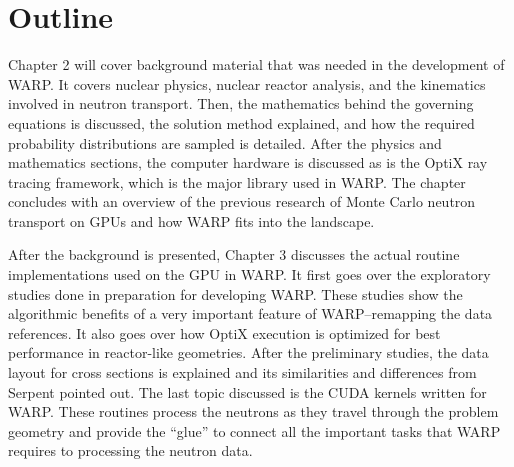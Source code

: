 
\section{Outline}

Chapter 2 will cover background material that was needed in the development of WARP.  It covers nuclear physics, nuclear reactor analysis, and the kinematics involved in neutron transport.  Then, the mathematics behind the governing equations is discussed, the solution method explained, and how the required probability distributions are sampled is detailed.  After the physics and mathematics sections, the computer hardware is discussed as is the OptiX ray tracing framework, which is the major library used in WARP.  The chapter concludes with an overview of the previous research of Monte Carlo neutron transport on GPUs and how WARP fits into the landscape.

After the background is presented, Chapter 3 discusses the actual routine implementations used on the GPU in WARP.  It first goes over the exploratory studies done in preparation for developing WARP.  These studies show the algorithmic benefits of a very important feature of WARP--remapping the data references.  It also goes over how OptiX execution is optimized for best performance in reactor-like geometries.  After the preliminary studies, the data layout for cross sections is explained and its similarities and differences from Serpent pointed out.  The last topic discussed is the CUDA kernels written for WARP.  These routines process the neutrons as they travel through the problem geometry and provide the ``glue'' to connect all the important tasks that WARP requires to processing the neutron data.

